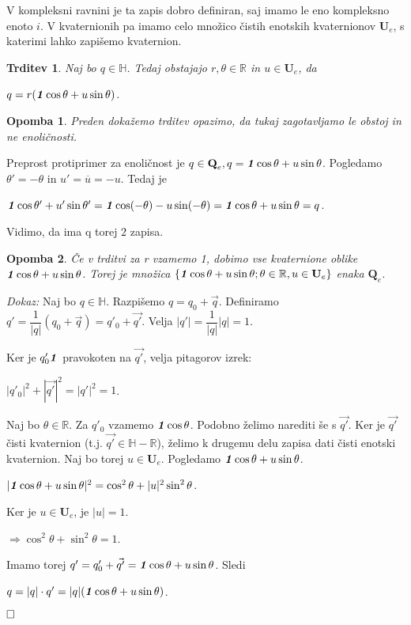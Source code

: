 \documentclass[a4paper,12pt]{article}
\def\R{\mathbb{R}} %
\def\H{\mathbb{H}} %
\def\Qe{\textbf{Q}_{e}} %
\def\Ue{\textbf{U}_{e}} %
\def\1{\textbf{\emph{1}}}
\newcommand{\conj}[1]{\overline{#1}}
\def\qed{$\hfill\Box$}   %
\newtheorem{trditev}{Trditev}
\newtheorem{opomba}{Opomba}
\begin{document}
V kompleksni ravnini je ta zapis dobro definiran, saj imamo le eno kompleksno enoto $i$.
V kvaternionih pa imamo celo množico čistih enotskih kvaternionov $\Ue$, s katerimi lahko zapišemo kvaternion.

\begin{trditev}
Naj bo $q \in \H$. Tedaj obstajajo $r, \theta \in \R$ in $u \in \Ue$, da
\begin{center}
   $q = r (\1\cos\theta + u\sin\theta)$.
\end{center}
\end{trditev}

\begin{opomba}
Preden dokažemo trditev opazimo, da tukaj zagotavljamo \emph{le obstoj} in ne enoličnosti.

\end{opomba}
Preprost protiprimer za enoličnost je $q \in \Qe, q = \1\cos\theta + u\sin\theta$.
Pogledamo $\theta' = -\theta$ in $u' = \conj{u} = -u$. Tedaj je
\begin{center}
   $\1\cos\theta' + u'\sin\theta' = \1\cos(-\theta) -u\sin(-\theta) = \1\cos\theta + u\sin\theta = q$.
\end{center}
Vidimo, da ima q torej $2$ zapisa.


\begin{opomba}
Če v trditvi za r vzamemo 1, dobimo vse kvaternione oblike $\1\cos\theta + u\sin\theta$. Torej je množica
$\left\{ \1\cos\theta + u\sin\theta; \theta \in \R , u \in \Ue \right\} $ enaka $\Qe$.
\end{opomba}

\noindent
{\em Dokaz:\/} Naj bo $q \in \H$. Razpišemo $q = q_{0} + \vec{q}$.
Definiramo $q' = \dfrac{1}{|q|}(q_{0} + \vec{q}) = q'_{0} + \vec{q'}$. Velja $|q'| = \dfrac{1}{|q|}|q| = 1$. 

\break
\noindent
Ker je $q'_{0}\1$ pravokoten na $\vec{q'}$, velja pitagorov izrek:
\begin{center}
   $|q'_{0}|^2 + |\vec{q'}|^2 = |q'|^2 = 1$.
\end{center} 
Naj bo $\theta \in \R$. Za $q'_{0}$ vzamemo $\1\cos\theta$. Podobno želimo narediti še s $\vec{q'}$.
Ker je $\vec{q'}$ čisti kvaternion (t.j. $\vec{q'} \in \H - \R$), želimo k drugemu delu zapisa dati čisti enotski kvaternion.
Naj bo torej $u \in \Ue$. Pogledamo $\1\cos\theta + u\sin\theta$.
\begin{center}
   $|\1\cos\theta + u\sin\theta|^2 = \cos^2\theta + |u|^2\sin^2\theta$. 
\end{center}
Ker je $u \in \Ue$, je $|u| = 1$.
\begin{center}
   $\Rightarrow \cos^2\theta + \sin^2\theta = 1$.
\end{center}
Imamo torej $q' = q'_{0} + \vec{q'} = \1\cos\theta + u\sin\theta$.
Sledi 
\begin{center}
   $q = |q| \cdot q' = |q|(\1\cos\theta + u\sin\theta)$.
\end{center}
\qed
\end{document}
